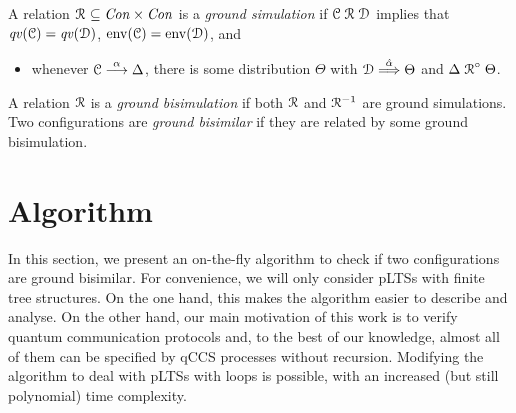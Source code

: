 \documentclass[a4paper,UKenglish,cleveref, autoref]{lipics-v2019}
\newcommand{\ptr}{{\rm env}}
\newcommand{\lift}[1]{\mathrel{{#1}^\circ}}
\newcommand{\Con}{{\it Con}}
\newcommand{\qv}{{\it qv}}
\newcommand{\CC}{{\cal C}}
\newcommand{\CD}{{\cal D}}
\begin{document}
\begin{definition}[\cite{DF12}]
	A relation $\aRel\ \subseteq \Con\times\Con$ is a \emph{ground simulation} if
	$\CC\aRel \CD$ implies that $\qv(\CC)=\qv(\CD)$, $\ptr(\CC)=\ptr(\CD)$,
	and
	\begin{itemize}
		\item whenever $\CC\ar{\alpha} \Delta$, there is some distribution $\Theta$ with $\CD\dar{\hat{\alpha}}\Theta$ and $\Delta \lift{\aRel} \Theta$.
	\end{itemize}
	A relation $\mathrel{{\mathcal R }}$ is a \emph{ground bisimulation} if both $\mathrel{{\mathcal R }}$ and
	$\mathrel{{\mathcal R }}^{-1}$ are ground simulations. Two configurations are \emph{ground bisimilar} if they are related by some ground bisimulation.
\end{definition}

\section{Algorithm}
In this section, we present an on-the-fly algorithm to check if two configurations are ground bisimilar.
For convenience, we will only consider pLTSs with finite tree structures. On the one hand, this makes the algorithm easier to describe and analyse. On the other hand, our main motivation of this work is to verify quantum communication protocols and, to the best of our knowledge, almost all of them can be specified by qCCS processes without recursion.
Modifying the algorithm to deal with pLTSs with loops is possible, with an increased (but still polynomial) time complexity.
\end{document}
